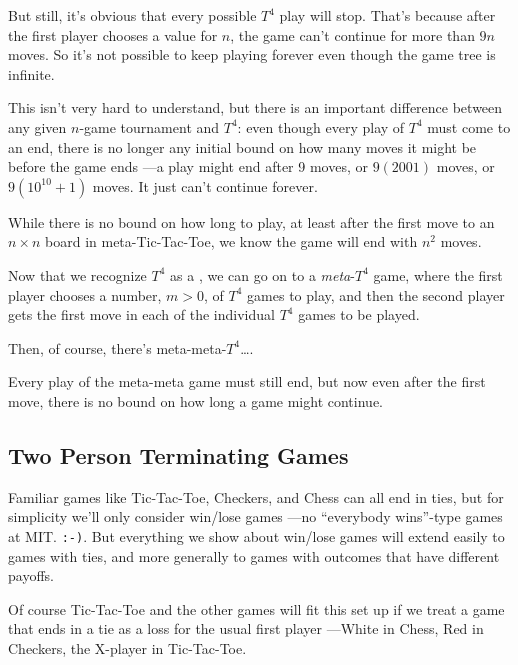 \begin{definition}
But still, it's obvious that every possible $T^4$ play will stop.
That's because after the first player chooses a value for $n$, the
game can't continue for more than $9n$ moves.  So it's not possible to
keep playing forever even though the game tree is infinite.

This isn't very hard to understand, but there is an important
difference between any given $n$-game tournament and $T^4$: even
though every play of $T^4$ must come to an end, there is no longer any
initial bound on how many moves it might be before the game ends ---a
play might end after 9 moves, or $9(2001)$ moves, or $9(10^{10}+1)$
moves.  It just can't continue forever.

\begin{staffnotes}

While there is no bound on how long to play, at least after the
first move to an $n \times n$ board in meta-Tic-Tac-Toe, we know the game
will end with $n^2$ moves.

\end{staffnotes}

Now that we recognize $T^4$ as a \tg, we can go on to
a \emph{meta}-$T^4$ game, where the first player chooses a number,
$m>0$, of $T^4$ games to play, and then the second player gets the
first move in each of the individual $T^4$ games to be played.

Then, of course, there's meta-meta-$T^4$\dots.

\begin{staffnotes}
Every play of the meta-meta game must still end, but now even
after the first move, there is no bound on how long a game might
continue.
\end{staffnotes}

\subsection{Two Person Terminating Games}

Familiar games like Tic-Tac-Toe, Checkers, and Chess can all end in
ties, but for simplicity we'll only consider win/lose games ---no
``everybody wins''-type games at MIT. \texttt{:-)}.  But everything we
show about win/lose games will extend easily to games with ties, and
more generally to games with outcomes that have different payoffs.

\begin{staffnotes}

Of course Tic-Tac-Toe and the
other games will fit this set up if we treat a game that ends in a tie as
a loss for the usual first player ---White in Chess, Red in Checkers, the
X-player in Tic-Tac-Toe.


\end{staffnotes}
\end{definition}
